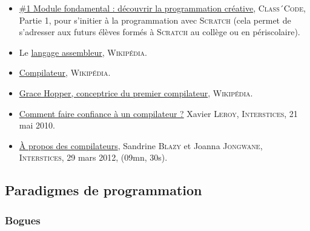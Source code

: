 \begin{gofurther}
\begin{itemize}\jazzitem
\item \href{https://pixees.fr/classcode/formations/module1/}{\#1 Module fondamental : découvrir la programmation créative}, \textsc{Class´Code}, Partie 1, pour s'initier à la programmation avec \textsc{Scratch} (cela permet de s'adresser aux futurs élèves formés à \textsc{Scratch} au collège ou en périscolaire).
\item Le \href{https://fr.wikipedia.org/wiki/Assembleur}{langage assembleur}, \textsc{Wikipédia}.
\end{itemize}

\vspace{2pt}
\begin{itemize}\jazzitem
\item \href{https://fr.wikipedia.org/wiki/Compilateur}{Compilateur}, \textsc{Wikipédia}.
\item \href{https://fr.wikipedia.org/wiki/Grace_Hopper}{Grace Hopper, conceptrice du premier compilateur}, \textsc{Wikipédia}.
\item \href{https://interstices.info/comment-faire-confiance-a-un-compilateur/}{Comment faire confiance à un compilateur ?} Xavier \textsc{Leroy}, \textsc{Interstices}, 21 mai 2010.
\end{itemize}

\vspace{2pt}
\begin{itemize}\jazzitem
\item \href{https://interstices.info/a-propos-des-compilateurs/}{À propos des compilateurs}, Sandrine \textsc{Blazy} et Joanna \textsc{Jongwane}, \textsc{Interstices}, 29 mars 2012, (09mn, 30s).
\end{itemize}
\end{gofurther}


\subsection[Paradigmes de programmation]{Paradigmes de programmation}
\label{sub:VI.2.2}

\subsubsection[Bogues]{Bogues}
\label{subsub:VI.2.2.1}

